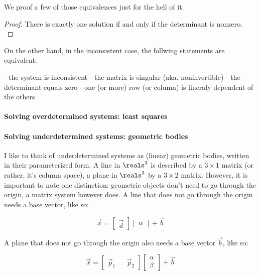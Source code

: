 We proof a few of those equivalences just for the hell of it. 

\begin{proof} There is exactly one solution if and only if the determinant is nonzero. \\
\end{proof}

On the other hand, in the inconsistent case, the follwing statements are equivalent:


    - the system is inconsistent
    - the matrix is singular (aka. noninvertible)
    - the determinant equals zero
    - one (or more) row (or column) is lineraly dependent of the others


\paragraph{Solving overdetermined systems: least squares}


\paragraph{Solving underdetermined systems: geometric bodies}
I like to think of underdetermined systems as (linear) geometric bodies, written in their parameterized form. A line in $\reals^3$ is described by a $3 \times 1$ matrix (or rather, it's column space), a plane in $\reals^3$ by a $3 \times 2$ matrix. However, it is important to note one distinction: geometric objects don't need to go through the origin, a matrix system however does. A line that does not go through the origin needs a base vector, like so: 

$$\vec{x} = \begin{bmatrix} \vec{d} \end{bmatrix} \begin{bmatrix} \alpha \end{bmatrix} + \vec{b}$$ 

A plane that does not go through the origin also needs a base vector $\vec{b}$, like so: 

$$\vec{x} = \begin{bmatrix} \vec{p}_1 && \vec{p}_2 \end{bmatrix} \begin{bmatrix} \alpha  \\ \beta \end{bmatrix} + \vec{b}  $$



